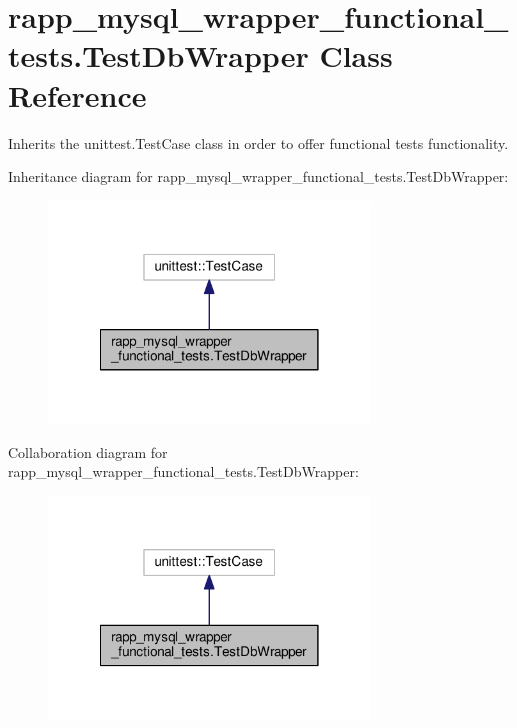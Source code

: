 \hypertarget{classrapp__mysql__wrapper__functional__tests_1_1TestDbWrapper}{\section{rapp\-\_\-mysql\-\_\-wrapper\-\_\-functional\-\_\-tests.\-Test\-Db\-Wrapper Class Reference}
\label{classrapp__mysql__wrapper__functional__tests_1_1TestDbWrapper}
}


Inherits the unittest.\-Test\-Case class in order to offer functional tests functionality.  




Inheritance diagram for rapp\-\_\-mysql\-\_\-wrapper\-\_\-functional\-\_\-tests.\-Test\-Db\-Wrapper\-:
\nopagebreak
\begin{figure}[H]
\begin{center}
\leavevmode
\includegraphics[width=242pt]{classrapp__mysql__wrapper__functional__tests_1_1TestDbWrapper__inherit__graph}
\end{center}
\end{figure}


Collaboration diagram for rapp\-\_\-mysql\-\_\-wrapper\-\_\-functional\-\_\-tests.\-Test\-Db\-Wrapper\-:
\nopagebreak
\begin{figure}[H]
\begin{center}
\leavevmode
\includegraphics[width=242pt]{classrapp__mysql__wrapper__functional__tests_1_1TestDbWrapper__coll__graph}
\end{center}
\end{figure}

